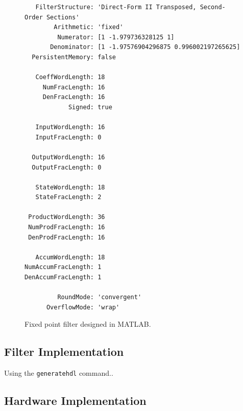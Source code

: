 \documentclass[]{article}
\begin{document}
\begin{figure}[htb]
	\begin{center}
		\begin{lstlisting}
   FilterStructure: 'Direct-Form II Transposed, Second-Order Sections'
        Arithmetic: 'fixed'
         Numerator: [1 -1.979736328125 1]                  
       Denominator: [1 -1.97576904296875 0.996002197265625]
  PersistentMemory: false

   CoeffWordLength: 18                
     NumFracLength: 16                
     DenFracLength: 16
            Signed: true              
                                      
   InputWordLength: 16                
   InputFracLength: 0                 
                                      
  OutputWordLength: 16
  OutputFracLength: 0                 
                                      
   StateWordLength: 18
   StateFracLength: 2                 
                                      
 ProductWordLength: 36                
 NumProdFracLength: 16                
 DenProdFracLength: 16                
                                      
   AccumWordLength: 18                
NumAccumFracLength: 1                 
DenAccumFracLength: 1                 

         RoundMode: 'convergent'      
      OverflowMode: 'wrap'  
		\end{lstlisting}
	\end{center}
	\caption{Fixed point filter designed in MATLAB.}
	\label{fig:Hdsdsos}
\end{figure}



\subsection{Filter Implementation} %
\label{sub:filter_implementation}

Using the \verb"generatehdl" command..




\subsection{Hardware Implementation} %
\label{sub:hardware_implementation}
\end{document}
